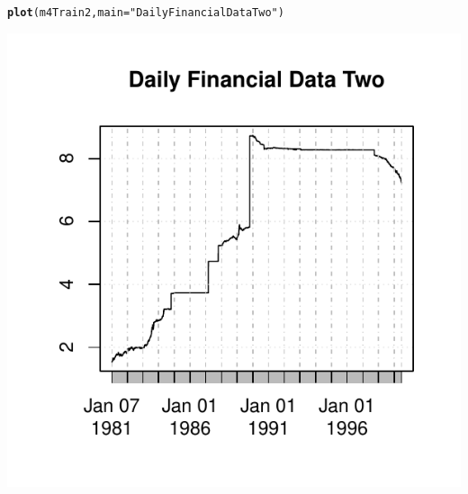 \documentclass[article]{jss}\usepackage[]{graphicx}\usepackage[]{color}
\makeatletter
\def\maxwidth{ %
  \ifdim\Gin@nat@width>\linewidth
    \linewidth
  \else
    \Gin@nat@width
  \fi
}
\newcommand{\hlstr}[1]{\textcolor[rgb]{0.192,0.494,0.8}{#1}}%
\newcommand{\hlstd}[1]{\textcolor[rgb]{0.345,0.345,0.345}{#1}}%
\newcommand{\hlkwc}[1]{\textcolor[rgb]{0.333,0.667,0.333}{#1}}%
\newcommand{\hlkwd}[1]{\textcolor[rgb]{0.737,0.353,0.396}{\textbf{#1}}}%
\newenvironment{kframe}{%
 \def\at@end@of@kframe{}%
 \ifinner\ifhmode%
  \def\at@end@of@kframe{\end{minipage}}%
  \begin{minipage}{\columnwidth}%
 \fi\fi%
 \def\FrameCommand##1{\hskip\@totalleftmargin \hskip-\fboxsep
 \colorbox{shadecolor}{##1}\hskip-\fboxsep
     \hskip-\linewidth \hskip-\@totalleftmargin \hskip\columnwidth}%
 \MakeFramed {\advance\hsize-\width
   \@totalleftmargin\z@ \linewidth\hsize
   \@setminipage}}%
 {\par\unskip\endMakeFramed%
 \at@end@of@kframe}
\newenvironment{knitrout}{}{} %
\makeatother
\begin{document}
\begin{knitrout}
{}


\begin{kframe}\begin{alltt}
\hlkwd{plot}\hlstd{(m4Train2,} \hlkwc{main} \hlstd{=} \hlstr{"Daily Financial Data Two"}\hlstd{)}
\end{alltt}
\end{kframe}

{\centering \includegraphics[width=\maxwidth]{figure/get_dat-2} 

}



\end{knitrout}

\clearpage


\end{document}
